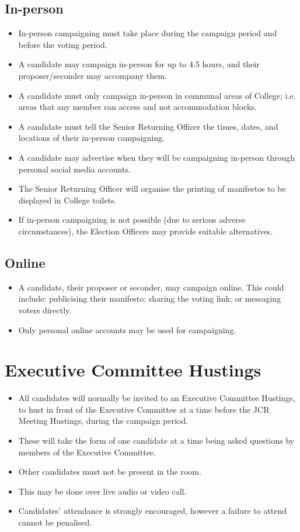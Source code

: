 \documentclass[12pt]{article}
\begin{document}
    \subsection{In-person}
    \begin{itemize}
        \item In-person campaigning must take place during the campaign period and before the voting period.
        \item A candidate may campaign in-person for up to 4.5 hours, and their proposer/seconder may accompany them.
        \item A candidate must only campaign in-person in communal areas of College; i.e. areas that any member can access and not accommodation blocks.
        \item A candidate must tell the Senior Returning Officer the times, dates, and locations of their in-person campaigning.
        \item A candidate may advertise when they will be campaigning in-person through personal social media accounts.
        \item The Senior Returning Officer will organise the printing of manifestos to be displayed in College toilets.
        \item If in-person campaigning is not possible (due to serious adverse circumstances), the Election Officers may provide suitable alternatives.
    \end{itemize}
    \subsection{Online}
    \begin{itemize}
	\item A candidate, their proposer or seconder, may campaign online. This could include: publicising their manifesto; sharing the voting link; or messaging voters directly.
	\item Only personal online accounts may be used for campaigning.
    \end{itemize}

   \section{Executive Committee Hustings}
   \begin{itemize}
	\item All candidates will normally be invited to an Executive Committee Hustings, to hust in front of the Executive Committee at a time before the JCR Meeting Hustings, during the campaign period.
	\item	These will take the form of one candidate at a time being asked questions by members of the Executive Committee.
	\item Other candidates must not be present in the room.
	\item This may be done over live audio or video call.
	\item Candidates' attendance is strongly encouraged, however a failure to attend cannot be penalised.
    \end{itemize}
\end{document}
